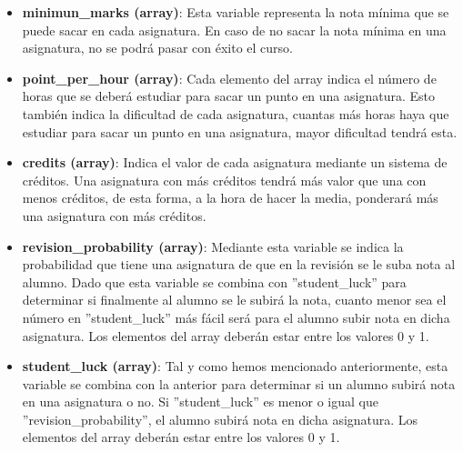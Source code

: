 \documentclass[11pt, a4paper, titlepage]{article}
\begin{document}
\begin{itemize}
\renewcommand{\labelitemi}{$\circ$}

\item \textbf{minimun\_marks (array)}: Esta variable representa la nota mínima que se puede sacar en cada asignatura. En caso de no sacar la nota mínima en una asignatura, no se podrá pasar con éxito el curso.

\vspace{5mm}

\item \textbf{point\_per\_hour (array)}: Cada elemento del array indica el número de horas que se deberá estudiar para sacar un punto en una asignatura. Esto también indica la dificultad de cada asignatura, cuantas más horas haya que estudiar para sacar un punto en una asignatura, mayor dificultad tendrá esta.

\vspace{5mm}

\item \textbf{credits (array)}: Indica el valor de cada asignatura mediante un sistema de créditos. Una asignatura con más créditos tendrá más valor que una con menos créditos, de esta forma, a la hora de hacer la media, ponderará más una asignatura con más créditos.

\vspace{5mm}

\item \textbf{revision\_probability (array)}: Mediante esta variable se indica la probabilidad que tiene una asignatura de que en la revisión se le suba nota al alumno. Dado que esta variable se combina con ''student\_luck'' para determinar si finalmente al alumno se le subirá la nota, cuanto menor sea el número en ''student\_luck'' más fácil será para el alumno subir nota en dicha asignatura. Los elementos del array deberán estar entre los valores 0 y 1.

\vspace{5mm}

\item \textbf{student\_luck (array)}: Tal y como hemos mencionado anteriormente, esta variable se combina con la anterior para determinar si un alumno subirá nota en una asignatura o no. Si ''student\_luck'' es menor o igual que ''revision\_probability'', el alumno subirá nota en dicha asignatura. Los elementos del array deberán estar entre los valores 0 y 1.

\vspace{5mm}


\end{itemize}
\end{document}
